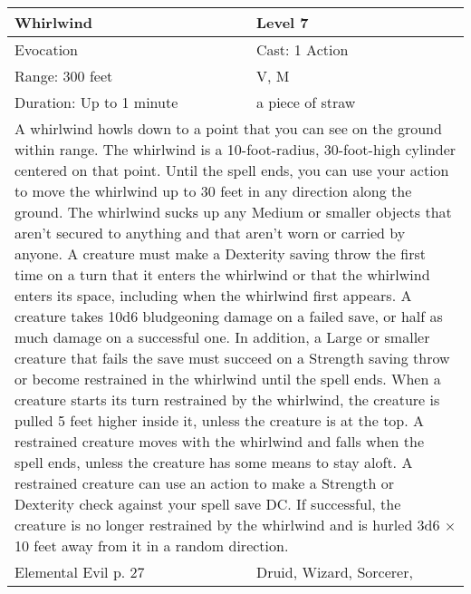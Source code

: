 \documentclass[11pt]{report}
\begin{document}
\begin{table}[H]
	\begin{tabular}{||p{6cm}|p{6cm}||}
		\hline\hline
		\bf{Whirlwind} & Level 7\\ \hline
		Evocation & Cast: 1 Action\\ \hline
		Range: 300 feet & V, M\\ \hline
		Duration: Up to 1 minute & a piece of straw\\ \hline
		\multicolumn{2}{||p{12cm}||}{A whirlwind howls down to a point that you can see on the ground within range. The whirlwind is a 10-foot-radius, 30-foot-high cylinder centered on that point. Until the spell ends, you can use your action to move the whirlwind up to 30 feet in any direction along the ground. The whirlwind sucks up any Medium or smaller objects that aren’t secured to anything and that aren’t worn or carried by anyone.
A creature must make a Dexterity saving throw the first time on a turn that it enters the
whirlwind or that the whirlwind enters its space, including when the whirlwind first appears. A creature takes 10d6 bludgeoning damage on a failed save, or half as much damage on a successful one. In addition, a Large or smaller creature that fails the save must succeed on a Strength saving throw or become restrained in the whirlwind until the spell ends. When a creature starts its turn restrained by the whirlwind, the creature is pulled 5 feet higher inside it, unless the creature is at the top.
A restrained creature moves with the whirlwind and falls when the spell ends, unless the creature has some means to stay aloft. A restrained creature can use an action to make a Strength or Dexterity check against your spell save DC. If successful, the creature is no longer restrained by the whirlwind and is hurled 3d6 × 10 feet away from it in a random direction.}\\ \hline
Elemental Evil p. 27 & Druid, Wizard, Sorcerer, \\ \hline\hline
	\end{tabular}
\end{table}
\end{document}
